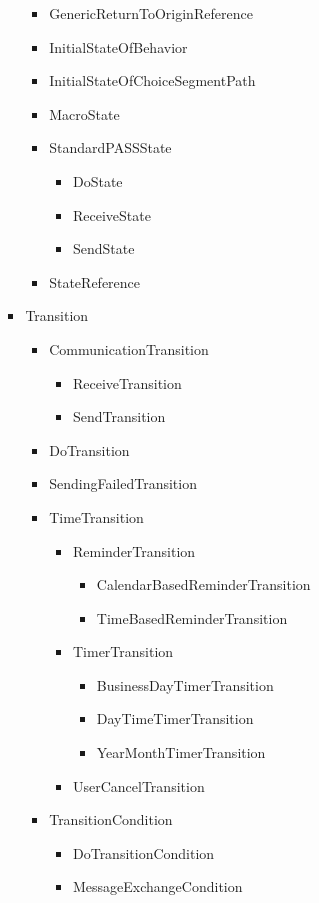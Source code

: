 \begin{itemize}
\begin{itemize}
\begin{itemize}
\begin{itemize}
			\item GenericReturnToOriginReference
			\item InitialStateOfBehavior
			\item InitialStateOfChoiceSegmentPath
			\item MacroState
			\item StandardPASSState
			\begin{itemize}
				\item DoState
				\item ReceiveState
				\item SendState
			\end{itemize}
			\item StateReference
		\end{itemize}
		\item Transition
		\begin{itemize}
			\item CommunicationTransition
			\begin{itemize}
				\item ReceiveTransition
				\item SendTransition
			\end{itemize}
			\item DoTransition
			\item SendingFailedTransition
			\item TimeTransition
			\begin{itemize}
				\item ReminderTransition
				\begin{itemize}
					\item CalendarBasedReminderTransition
					\item TimeBasedReminderTransition
				\end{itemize}
				\item TimerTransition
				\begin{itemize}
					\item BusinessDayTimerTransition
					\item DayTimeTimerTransition
					\item YearMonthTimerTransition
				\end{itemize}
				\item UserCancelTransition
			\end{itemize}
			\item TransitionCondition
			\begin{itemize}
				\item DoTransitionCondition
				\item MessageExchangeCondition

\end{itemize}
\end{itemize}
\end{itemize}
\end{itemize}
\end{itemize}

